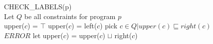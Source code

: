 \begin{algorithm}[h]
\SetAlgoNoEnd
CHECK\_LABELS(p)\\
  Let $Q$ be all constraints for program $p$\\

{
  {
    upper($c$) = $\top$
  }
  \Else
  {
    upper($c$) = left($c$)
  }
}
{
  pick $c \in Q | upper(c) \sqsubseteq right(c)$\\
  {
    $ERROR$
  }
  let upper($c$) = upper($c$) $\sqcup$ right($c$)
}
\end{algorithm}
